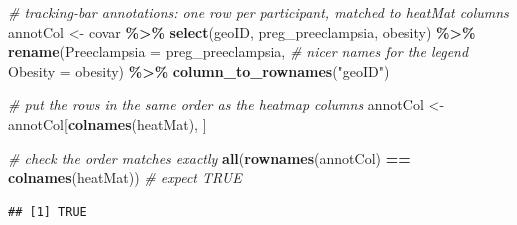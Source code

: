 \documentclass[
]{article}
\newenvironment{Shaded}{\begin{snugshade}}{\end{snugshade}}
\newcommand{\AttributeTok}[1]{\textcolor[rgb]{0.13,0.29,0.53}{#1}}
\newcommand{\CommentTok}[1]{\textcolor[rgb]{0.56,0.35,0.01}{\textit{#1}}}
\newcommand{\FunctionTok}[1]{\textcolor[rgb]{0.13,0.29,0.53}{\textbf{#1}}}
\newcommand{\NormalTok}[1]{#1}
\newcommand{\OtherTok}[1]{\textcolor[rgb]{0.56,0.35,0.01}{#1}}
\newcommand{\SpecialCharTok}[1]{\textcolor[rgb]{0.81,0.36,0.00}{\textbf{#1}}}
\newcommand{\StringTok}[1]{\textcolor[rgb]{0.31,0.60,0.02}{#1}}
\begin{document}
\begin{Shaded}
\begin{Highlighting}[]
\CommentTok{\# tracking{-}bar annotations: one row per participant, matched to heatMat columns}
\NormalTok{annotCol }\OtherTok{\textless{}{-}}\NormalTok{ covar }\SpecialCharTok{\%\textgreater{}\%}
  \FunctionTok{select}\NormalTok{(geoID, preg\_preeclampsia, obesity) }\SpecialCharTok{\%\textgreater{}\%}
  \FunctionTok{rename}\NormalTok{(}\AttributeTok{Preeclampsia =}\NormalTok{ preg\_preeclampsia,   }\CommentTok{\# nicer names for the legend}
         \AttributeTok{Obesity =}\NormalTok{ obesity) }\SpecialCharTok{\%\textgreater{}\%}
  \FunctionTok{column\_to\_rownames}\NormalTok{(}\StringTok{"geoID"}\NormalTok{)}

\CommentTok{\# put the rows in the same order as the heatmap columns}
\NormalTok{annotCol }\OtherTok{\textless{}{-}}\NormalTok{ annotCol[}\FunctionTok{colnames}\NormalTok{(heatMat), ]}

\CommentTok{\# check the order matches exactly}
\FunctionTok{all}\NormalTok{(}\FunctionTok{rownames}\NormalTok{(annotCol) }\SpecialCharTok{==} \FunctionTok{colnames}\NormalTok{(heatMat)) }\CommentTok{\# expect TRUE}
\end{Highlighting}
\end{Shaded}

\begin{verbatim}
## [1] TRUE
\end{verbatim}
\end{document}
